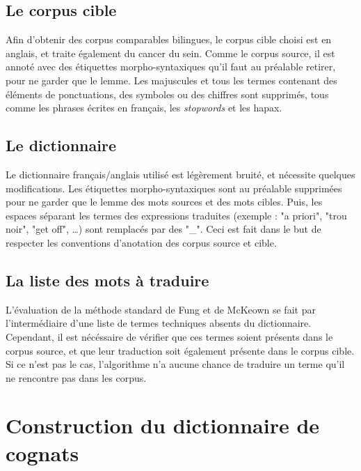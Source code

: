 	\subsection{Le corpus cible}
	
	Afin d'obtenir des corpus comparables bilingues, le corpus cible choisi est en anglais, et traite également du cancer du sein. Comme le corpus source, il est annoté avec des étiquettes morpho-syntaxiques qu'il faut au préalable retirer, pour ne garder que le lemme. Les majuscules et tous les termes contenant des éléments de ponctuations, des symboles ou des chiffres sont supprimés, tous comme les phrases écrites en français, les \textit{stopwords} et les hapax.
	
	\subsection{Le dictionnaire}
	
	Le dictionnaire français/anglais utilisé est légèrement bruité, et nécessite quelques modifications. Les étiquettes morpho-syntaxiques sont au préalable supprimées pour ne garder que le lemme des mots sources et des mots cibles. Puis, les espaces séparant les termes des expressions traduites (exemple : "a priori", "trou noir", "get off", \dots) sont remplacés par des "\_". Ceci est fait dans le but de respecter les conventions d'anotation des corpus source et cible.
	
	\subsection{La liste des mots à traduire}
	
	L'évaluation de la méthode standard de Fung et de McKeown se fait par l'intermédiaire d'une liste de termes techniques absents du dictionnaire. Cependant, il est nécéssaire de vérifier que ces termes soient présents dans le corpus source, et que leur traduction soit également présente dans le corpus cible. Si ce n'est pas le cas, l'algorithme n'a aucune chance de traduire un terme qu'il ne rencontre pas dans les corpus.


\section{Construction du dictionnaire de cognats}

